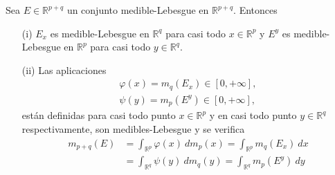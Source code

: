 \begin{teo}
Sea $E \in \mathbb{R}^{p+q}$ un conjunto medible-Lebesgue en $\mathbb{R}^{p+q}$. Entonces
\begin{enumerate}
    \item[(i)] $E_x$ es medible-Lebesgue en $\mathbb{R}^{q}$ para casi todo $x \in \mathbb{R}^{p}$ y $E^y$ es medible-Lebesgue en $\mathbb{R}^{p}$ para casi todo $y \in \mathbb{R}^{q}$.
    \item[(ii)] Las aplicaciones 
    \begin{align*}
        \varphi(x) = m_q(E_x) \in [0,+\infty], \\
        \psi(y) = m_p(E^y) \in [0,+\infty],
    \end{align*}
    están definidas para casi todo punto $x \in \mathbb{R}^{p}$ y en casi todo punto $y \in \mathbb{R}^{q}$ respectivamente, son medibles-Lebesgue y se verifica
    \begin{align*}
        m_{p+q}(E) &= \int_{\mathbb{R}^{p}}{\varphi(x) \ dm_p(x)} = \int_{\mathbb{R}^{p}}{m_q(E_x) \ dx} \\
        &= \int_{\mathbb{R}^{q}}{\psi(y) \ dm_q(y)} = \int_{\mathbb{R}^{q}}{m_p(E^y) \ dy}
    \end{align*}
\end{enumerate}
\end{teo}

